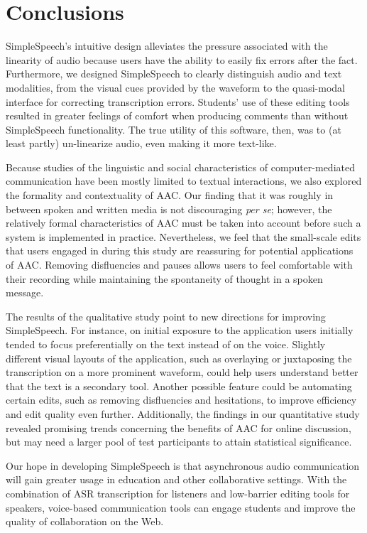 \section{Conclusions}

SimpleSpeech's intuitive design alleviates the pressure associated with the linearity of audio because users have the ability to easily fix errors after the fact.
Furthermore, we designed SimpleSpeech to clearly distinguish audio and text modalities, from the visual cues provided by the waveform to the quasi-modal interface for correcting transcription errors.
Students' use of these editing tools resulted in greater feelings of comfort when producing comments than without SimpleSpeech functionality.
The true utility of this software, then, was to (at least partly) un-linearize audio, even making it more text-like.

Because studies of the linguistic and social characteristics of computer-mediated communication have been mostly limited to textual interactions, we also explored the formality and contextuality of AAC. 
Our finding that it was roughly in between spoken and written media is not discouraging \textit{per se}; however, the relatively formal characteristics of AAC must be taken into account before such a system is implemented in practice.
Nevertheless, we feel that the small-scale edits that users engaged in during this study are reassuring for potential applications of AAC.
Removing disfluencies and pauses allows users to feel comfortable with their recording while maintaining the spontaneity of thought in a spoken message.

The results of the qualitative study point to new directions for improving SimpleSpeech. 
For instance, on initial exposure to the application users initially tended to focus preferentially on the text instead of on the voice.
Slightly different visual layouts of the application, such as overlaying or juxtaposing the transcription on a more prominent waveform, could help users understand better that the text is a secondary tool.
Another possible feature could be automating certain edits, such as removing disfluencies and hesitations, to improve efficiency and edit quality even further.
Additionally, the findings in our quantitative study revealed promising trends concerning the benefits of AAC for online discussion, but may need a larger pool of test participants to attain statistical significance.

Our hope in developing SimpleSpeech is that asynchronous audio communication will gain greater usage in education and other collaborative settings. 
With the combination of ASR transcription for listeners and low-barrier editing tools for speakers, voice-based communication tools can engage students and improve the quality of collaboration on the Web.
